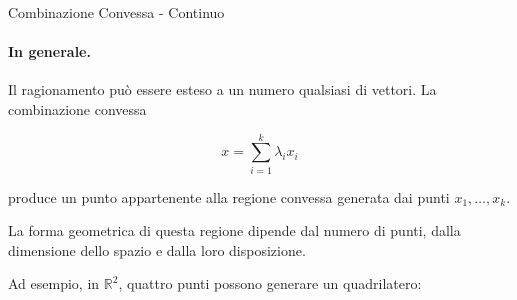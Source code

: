 \begin{definition}{Combinazione Convessa - Continuo}
\paragraph{In generale.}

Il ragionamento può essere esteso a un numero qualsiasi di vettori. La combinazione convessa

$$
x=\sum_{i=1}^{k}\lambda_i x_i
$$

produce un punto appartenente alla regione convessa generata dai punti $x_1,\ldots,x_k$.

La forma geometrica di questa regione dipende dal numero di punti, dalla dimensione dello spazio e dalla loro disposizione.

Ad esempio, in $\mathbb{R}^2$, quattro punti possono generare un quadrilatero:

\begin{center}
\end{center}


\end{definition}



\newpage

